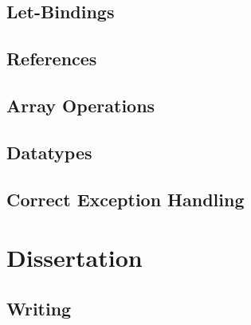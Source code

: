 \subsection{Let-Bindings}

\subsection{References}

\subsection{Array Operations}

\subsection{Datatypes}

\subsection{Correct Exception Handling}

\section{Dissertation}

\subsection{Writing}

